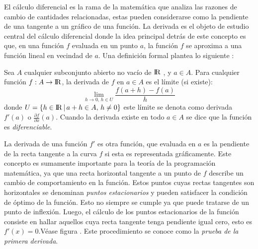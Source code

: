 El cálculo diferencial es la rama de la matemática que analiza las razones de cambio de cantidades relacionadas, estas pueden considerarse como la pendiente de una tangente a un gráfico de una función. La derivada es el objeto de estudio central del cálculo diferencial donde la idea principal detrás de este concepto es que, en una función $f$ evaluada en un punto $a$, la función $f$ se aproxima a una función lineal en vecindad de $a$. Una definición formal plantea lo siguiente \cite{jean_algebra_2017}:
\begin{defn}

Sea $A$  cualquier subconjunto abierto no vacío de ${\rm I\!R}$ , y $a \in A$. Para cualquier función $f: A \rightarrow {\rm I\!R}$, la derivada de $f$ en $a \in A$ es el límite (si existe):
\begin{equation}
\lim_{h\to 0, \, h \in U} \frac{f(a+h)-f(a)}{h}
\end{equation}
donde $U =\{h \in {\rm I\!R}\,|\, a+h \in A, \, h \neq 0 \}$ este límite se denota como derivada $f'(a)$ o $\frac{\partial f}{\partial x}(a)$. Cuando la derivada existe en todo $a \in A$ se dice que la función es \textit{diferenciable}.
\end{defn}

La derivada de una función $f'$ es otra función, que evaluada en $a$ es la pendiente de la recta tangente a la curva $f$ si esta es representada gráficamente. Este concepto es sumamente importante para la teoría de la programación matemática, ya que una recta horizontal tangente a un punto de $f$ describe un cambio de comportamiento en la función. Estos puntos cuyas rectas tangentes son horizontales se denominan \textit{puntos estacionarios} y pueden satisfacer la condición de óptimo de la función. Esto no siempre se cumple ya que puede tratarse de un punto de inflexión. Luego, el cálculo de los puntos estacionarios de la función consiste en hallar aquellos cuya recta tangente tenga pendiente igual cero, esto es $f'(x)=0$.Véase figura . Este procedimiento se conoce como la \textit{prueba de la primera derivada}.

